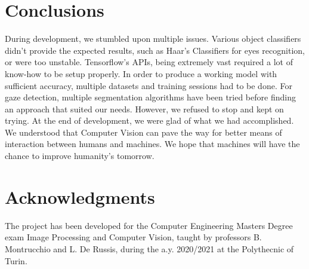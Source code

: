 \documentclass[a4paper, 12pt]{article}
\begin{document}
\section{Conclusions}
\label{Conclusions}
During development, we stumbled upon multiple issues.
Various object classifiers didn't provide the expected results, such as Haar’s Classifiers for eyes recognition, or were too unstable.
Tensorflow's APIs, being extremely vast required a lot of know-how to be setup properly. In order to produce a working model with sufficient accuracy, multiple datasets and training sessions had to be done.
For gaze detection, multiple segmentation algorithms have been tried before finding an approach that suited our needs.\linebreak
However, we refused to stop and kept on trying.
At the end of development, we were glad of what we had accomplished. We understood that Computer Vision can pave the way for better means of interaction between humans and machines.\linebreak
We hope that machines will have the chance to improve humanity's tomorrow.

\section{Acknowledgments}
\label{Acks}
The project has been developed for the Computer Engineering Masters Degree exam Image Processing and Computer Vision, taught by professors B. Montrucchio and L. De Russis, during the a.y. 2020/2021 at the Polythecnic of Turin.

\onecolumn
\end{document}
